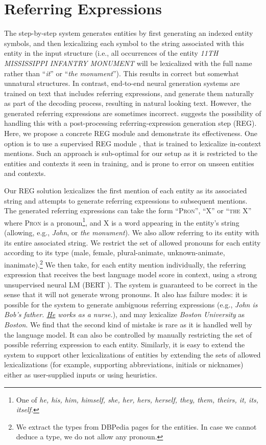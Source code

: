 \documentclass[11pt,a4paper,table,xcdraw]{article}
\begin{document}
\section{Referring Expressions}
\label{sec:reg}
The step-by-step system generates entities by first generating an indexed entity symbols, and then lexicalizing each symbol to the string associated with this entity in the input structure (i.e., all occurrences of the entity \emph{11TH MISSISSIPPI INFANTRY MONUMENT} will be lexicalized with the full name rather than ``\emph{it}'' or ``\emph{the monument}''). This results in correct but somewhat unnatural structures. In contrast, end-to-end neural generation systems are trained on text that includes referring expressions, and generate them naturally as part of the decoding process, resulting in natural looking text. However, the generated referring expressions are sometimes incorrect. \citet{step-by-step} suggests the possibility of handling this with a post-processing referring-expression generation step (REG). Here, we propose a concrete REG module and demonstrate its effectiveness. One option is to use a supervised REG module \cite{ferreira2018neuralreg}, that is trained to lexicalize in-context mentions. Such an approach is sub-optimal for our setup as it is restricted to the entities and contexts it seen in training, and is prone to error on unseen entities and contexts.

Our REG solution lexicalizes the first mention of each entity as its associated string and attempts to generate referring expressions to subsequent mentions. The generated referring expressions can take the form ``\textsc{Pron}'', ``\textsc{X}'' or ``\textsc{the X}'' where \textsc{Pron} is a pronoun\footnote{One of \emph{he, his, him, himself, she, her, hers, herself, they, them, theirs, it, its, itself.}}, and \textsc{X} is a word appearing in the entity's string (allowing, e.g., \emph{John}, or \emph{the monument}).
We also allow referring to its entity with its entire associated string. We restrict the set of allowed pronouns for each entity according to its type (male, female, plural-animate, unknown-animate, inanimate).\footnote{We extract the types from DBPedia pages for the entities. In case we cannot deduce a type, we do not allow any pronoun.} We then take, for each entity mention individually, the referring expression that receives the best language model score in context, using a strong unsupervised neural LM (BERT \cite{devlin2018bert}). The system is guaranteed to be correct in the sense that it will not generate wrong pronouns. It also has failure modes: it is possible for the system to generate ambiguous referring expressions (e.g., \emph{John is Bob's father. \underline{He} works as a nurse.}), and may lexicalize \emph{Boston University} as \emph{Boston}. We find that the second kind of mistake is rare as it is handled well by the language model. It can also be controlled by manually restricting the set of possible referring expression to each entity. Similarly, it is easy to extend the system to support other lexicalizations of entities by extending the sets of allowed lexicalizations (for example, supporting abbreviations, initials or nicknames) either as user-supplied inputs or using heuristics.
\end{document}
